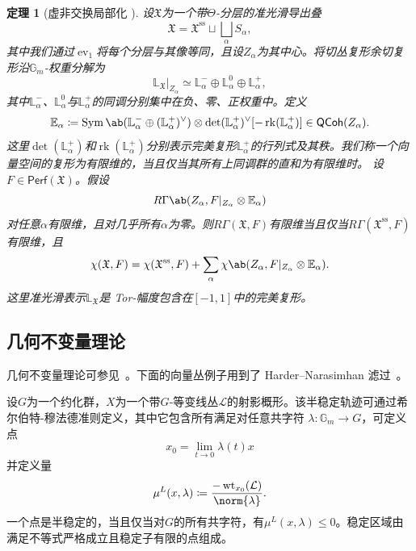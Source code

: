 \documentclass{amsart}
\newtheorem{thm}{定理}[section]
\theoremstyle{definition}
\theoremstyle{remark}
\theoremstyle{plain}
\theoremstyle{definition}
\theoremstyle{remark}
\newcommand{\G}{\mathbb{G}}
\newcommand{\E}{\mathbb{E}}
\renewcommand{\L}{\mathbb{L}}
\newcommand{\mc}[1]{\mathcal{#1}}
\newcommand{\mf}[1]{\mathfrak{#1}}
\newcommand{\mr}[1]{\mathrm{#1}}
\newcommand{\on}[1]{\operatorname{#1}}
\newcommand{\ms}[1]{\mathsf{#1}}
\newcommand{\1}{\mathbf{1}}
\newcommand{\2}{\mathbf{2}}
\newcommand{\3}{\mathbf{3}}
\DeclareMathOperator{\ev}{ev}
\begin{document}
\begin{thm}[虚非交换局部化 {\cite[定理~5.1]{HLlocalization}}]
    设\(\mf{X}\)为一个带\(\Theta\)-分层的准光滑导出叠
    \[
        \mf{X}
        =
        \mf{X}^{\mr{ss}}
        \sqcup
        \bigsqcup_\alpha S_\alpha,
    \]
    其中我们通过\(\ev_1\)将每个分层与其像等同，且设\(Z_\alpha\)为其中心。将切丛复形余切复形沿\(\G_m\)-权重分解为
    \[
        \L_{\mf{X}}|_{Z_\alpha}
        \simeq
        \L_\alpha^-
        \oplus
        \L_\alpha^0
        \oplus
        \L_\alpha^+,
    \]
    其中\(\L_\alpha^-\)、\(\L_\alpha^0\)与\(\L_\alpha^+\)的同调分别集中在负、零、正权重中。定义
    \[
        \E_\alpha
        \coloneqq
        \on{Sym}\ab(
            \L_\alpha^-
            \oplus
            (\L_\alpha^+)^\vee
        )
        \otimes
        \det(\L_\alpha^+)^\vee
        [-\on{rk}(\L_\alpha^+)]
        \in
        \ms{QCoh}(Z_\alpha).
    \]
    这里\(\det(\L_\alpha^+)\)和\(\on{rk}(\L_\alpha^+)\)分别表示完美复形\(\L_\alpha^+\)的行列式及其秩。我们称一个向量空间的复形为有限维的，当且仅当其所有上同调群的直和为有限维时。
    设\(F\in\ms{Perf}(\mf{X})\)。假设
    \[
        R\Gamma\ab(
            Z_\alpha,
            F|_{Z_\alpha}\otimes\E_\alpha
        )
    \]
    对任意\(\alpha\)有限维，且对几乎所有\(\alpha\)为零。则\(R\Gamma(\mf{X},F)\)有限维当且仅当\(R\Gamma(\mf{X}^{\mr{ss}},F)\)有限维，且
    \[
        \chi(\mf{X},F)
        =
        \chi(\mf{X}^{\mr{ss}},F)
        +
        \sum_\alpha
        \chi\ab(
            Z_\alpha,
            F|_{Z_\alpha}\otimes\E_\alpha
        ).
    \]
    这里准光滑表示\(\L_{\mf{X}}\)是 Tor-幅度包含在\([-1,1]\)中的完美复形。
\end{thm}


\subsection{几何不变量理论}%
\label{sub:Geometric invariant theory}

几何不变量理论可参见~\cite{MFK1994}。下面的向量丛例子用到了 Harder--Narasimhan 滤过~\cite{HN1975}。

设\(G\)为一个约化群，\(X\)为一个带\(G\)-等变线丛\(\mc{L}\)的射影概形。该半稳定轨迹可通过希尔伯特-穆法德准则定义，其中它包含所有满足对任意共字符
\(\lambda \colon \G_m \to G\)，可定义点 
\[ x_0 = \lim_{t \to 0} \lambda(t) x \]
并定义量
\[ \mu^L(x, \lambda) \coloneqq \frac{-\on{wt}_{x_0}(\mc{L})}{\norm{\lambda}}. \]
一个点是半稳定的，当且仅当对\(G\)的所有共字符，有\(\mu^L(x, \lambda) \leq 0\)。稳定区域由满足不等式严格成立且稳定子有限的点组成。
\end{document}
